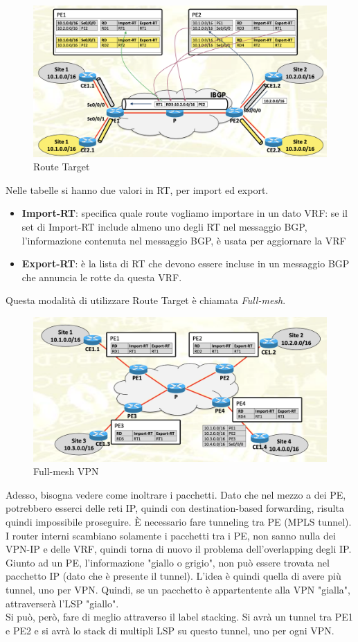 \documentclass{article}
\begin{document}
\begin{figure}[H]
    \centering
    \includegraphics[scale=0.5]{figures/route target.png}
    \caption{Route Target}
\end{figure}
Nelle tabelle si hanno due valori in RT, per import ed export.
\begin{itemize}
    \item \textbf{Import-RT}: specifica quale route vogliamo importare in un dato VRF: se il set di Import-RT include almeno uno degli RT nel messaggio BGP, l'informazione contenuta nel messaggio BGP, è usata per aggiornare la VRF
    \item \textbf{Export-RT}: è la lista di RT che devono essere incluse in un messaggio BGP che annuncia le rotte da questa VRF.
\end{itemize}
Questa modalità di utilizzare Route Target è chiamata \textit{Full-mesh}.
\begin{figure}[H]
    \centering
    \includegraphics[scale=0.5]{figures/full-mesh vpn.png}
    \caption{Full-mesh VPN}
\end{figure}
\noindent Adesso, bisogna vedere come inoltrare i pacchetti. Dato che nel mezzo a dei PE, potrebbero esserci delle reti IP, quindi con destination-based forwarding, risulta quindi impossibile proseguire. È necessario fare tunneling tra PE (MPLS tunnel). I router interni scambiano solamente i pacchetti tra i PE, non sanno nulla dei VPN-IP e delle VRF, quindi torna di nuovo il problema dell'overlapping degli IP. Giunto ad un PE, l'informazione "giallo o grigio", non può essere trovata nel pacchetto IP (dato che è presente il tunnel). L'idea è quindi quella di avere più tunnel, uno per VPN. Quindi, se un pacchetto è appartentente alla VPN "gialla", attraverserà l'LSP "giallo". \\ Si può, però, fare di meglio attraverso il label stacking. Si avrà un tunnel tra PE1 e PE2 e si avrà lo stack di multipli LSP su questo tunnel, uno per ogni VPN. 
\end{document}
